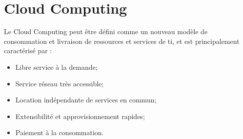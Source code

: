 




\section{Cloud Computing}
Le Cloud Computing peut être défini comme un nouveau modèle de consommation et livraison de ressources et services de \gls{ti}, et est principalement caractérisé par :
\begin{itemize}
\item Libre service à la demande;
\item Service réseau très accessible;
\item Location indépendante de services en commun;
\item Extensibilité et approvisionnement rapides;
\item Paiement à la consommation.
\end{itemize}

